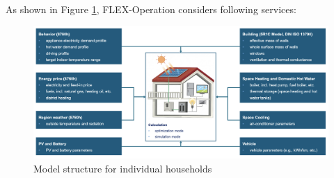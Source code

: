 As shown in Figure \ref{fig:flex-operation}, FLEX-Operation considers following services:


\begin{figure}[h]
  \centering
  \includegraphics[width=\textwidth]{Images/flex-operation.png}
  \caption{Model structure for individual households}
  \label{fig:flex-operation}
\end{figure}



